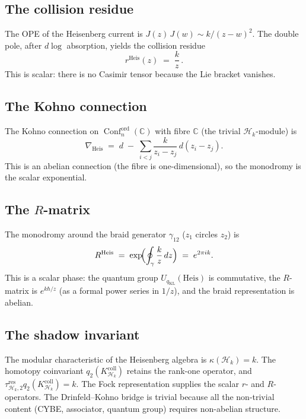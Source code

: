 \documentclass[11pt,reqno]{amsart}
\theoremstyle{definition}
\theoremstyle{remark}
\newcommand{\cH}{\mathcal{H}}
\DeclareMathOperator{\Conf}{Conf}
\newcommand{\CC}{\mathbb{C}}
\numberwithin{equation}{section}
\begin{document}
\subsection{The collision residue}

The OPE of the Heisenberg current is
$J(z)\,J(w) \sim k/(z-w)^2$.
The double pole, after $d\log$ absorption, yields the
collision residue
\begin{equation}\label{eq:dk-heis-residue}
r^{\mathrm{Heis}}(z)
\;=\;
\frac{k}{z}\,.
\end{equation}
This is scalar: there is no Casimir tensor because the
Lie bracket vanishes.

\subsection{The Kohno connection}

The Kohno connection on $\Conf_n^{\mathrm{ord}}(\CC)$
with fibre $\CC$ (the trivial $\cH_k$-module) is
\[
\nabla_{\mathrm{Heis}}
\;=\;
d
\;-\;
\sum_{i < j}
\frac{k}{z_i - z_j}\,d(z_i - z_j).
\]
This is an abelian connection (the fibre is one-dimensional),
so the monodromy is the scalar exponential.

\subsection{The $R$-matrix}

The monodromy around the braid generator $\gamma_{12}$
($z_1$ circles $z_2$) is
\[
R^{\mathrm{Heis}}
\;=\;
\exp\!\Bigl(
\oint_\gamma \frac{k}{z}\,dz
\Bigr)
\;=\;
e^{2\pi i k}.
\]
This is a scalar phase: the quantum group
$U_{q_{\mathrm{KL}}}(\mathrm{Heis})$ is commutative, the $R$-matrix is
$e^{k\hbar/z}$ (as a formal power series in $1/z$), and
the braid representation is abelian.

\subsection{The shadow invariant}
The modular characteristic of the Heisenberg algebra is
$\kappa(\cH_k)=k$. The homotopy coinvariant
$q_2(K_{\cH_k}^{\mathrm{coll}})$ retains the rank-one operator, and
$\tau_{\cH_k,2}^{\mathrm{res}}q_2(K_{\cH_k}^{\mathrm{coll}})=k$.
The Fock representation supplies the scalar $r$- and $R$-operators.
The Drinfeld--Kohno bridge is trivial because all the
non-trivial content (CYBE, associator, quantum group)
requires non-abelian structure.

\end{document}
